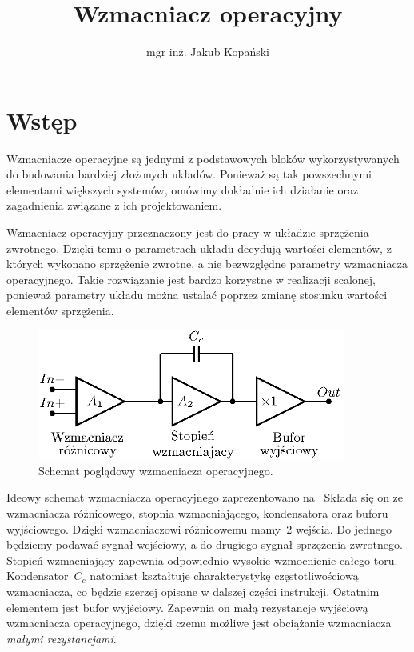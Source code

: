 \documentclass[twoside,pl,final]{labman}
\title{Wzmacniacz operacyjny}
\author{mgr inż. Jakub Kopański}
\begin{document}
\maketitle
\tableofcontents
\clearpage
\listoffigures
\clearpage

\chapter{Wstęp}
\label{intro}
Wzmacniacze operacyjne są jednymi z podstawowych bloków
wykorzystywanych do budowania bardziej złożonych układów.
Ponieważ są tak powszechnymi elementami większych systemów,
omówimy dokładnie ich działanie oraz
zagadnienia związane z ich projektowaniem.

Wzmacniacz operacyjny przeznaczony jest do
pracy w układzie sprzężenia zwrotnego.
Dzięki temu o parametrach układu decydują
wartości elementów, z których wykonano sprzężenie zwrotne,
a nie bezwzględne parametry wzmacniacza operacyjnego.
Takie rozwiązanie jest bardzo korzystne w realizacji scalonej,
ponieważ parametry układu można ustalać poprzez zmianę
stosunku wartości elementów sprzężenia.

\begin{figure}[!htbp]
  \centering
  \includegraphics[width=0.9\textwidth]{idea}
  \caption{Schemat poglądowy wzmacniacza operacyjnego.}
  \label{fig:idea}
\end{figure}

Ideowy schemat wzmacniacza operacyjnego
zaprezentowano na~
Składa się on ze wzmacniacza różnicowego,
stopnia wzmacniającego, kondensatora oraz buforu wyjściowego.
Dzięki wzmacniaczowi różnicowemu mamy~2 wejścia.
Do jednego będziemy podawać sygnał wejściowy,
a do drugiego sygnał sprzężenia zwrotnego.
Stopień wzmacniający zapewnia odpowiednio wysokie
wzmocnienie całego toru.
Kondensator~$C_c$ natomiast
kształtuje charakterystykę częstotliwościową wzmacniacza,
co będzie szerzej opisane w dalszej części instrukcji.
Ostatnim elementem jest bufor wyjściowy.
Zapewnia on małą rezystancje wyjściową wzmacniacza operacyjnego,
dzięki czemu możliwe jest obciążanie wzmacniacza \emph{małymi rezystancjami}.
\end{document}
